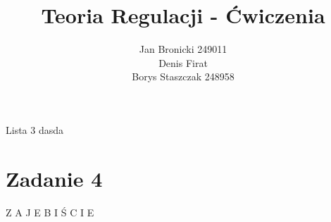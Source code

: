 \documentclass{article}
\title{Teoria Regulacji - Ćwiczenia}
\author{Jan Bronicki 249011 \\
        Denis Firat         \\
        Borys Staszczak 248958 }
\date{}
\begin{document}
\maketitle
\begin{center}
    Lista 3 dasda
\end{center}

\section*{Zadanie 4}
Z A J E B I Ś C I E
\end{document}
